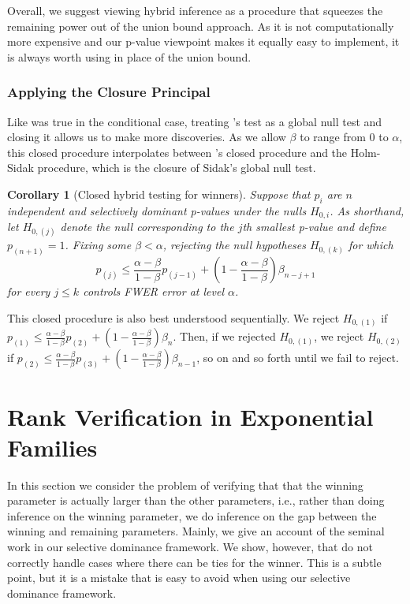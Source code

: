 \documentclass{article}
\newtheorem{corollary}{Corollary}
\begin{document}
Overall, we suggest viewing hybrid inference as a procedure that squeezes the remaining power out of the union bound approach. As it is not computationally more expensive and our p-value viewpoint makes it equally easy to implement, it is always worth using in place of the union bound. 

\subsubsection{Applying the Closure Principal}

Like was true in the conditional case, treating 's test as a global null test and closing it allows us to make more discoveries. As we allow $\beta$ to range from $0$ to $\alpha$, this closed procedure interpolates between 's closed procedure and the Holm-Sidak procedure, which is the closure of Sidak's global null test. 

\begin{corollary}[Closed hybrid testing for winners]
    \label{cor:hyb_closed}
    Suppose that $p_i$ are $n$ independent and selectively dominant p-values under the nulls $H_{0, i}$. As shorthand, let $H_{0, (j)}$ denote the null corresponding to the $j$th smallest p-value and define $p_{(n+1)} = 1$. Fixing some $\beta < \alpha$, rejecting the null hypotheses $H_{0, (k)}$ for which
    \begin{equation*}
        p_{(j)} \leq \frac{\alpha - \beta}{1-\beta} p_{(j-1)} + \left(1 - \frac{\alpha - \beta}{1-\beta} \right) \beta_{n - j + 1}   
    \end{equation*}
    for every $j \leq k$ controls FWER error at level $\alpha$. 
\end{corollary}

This closed procedure is also best understood sequentially. We reject $H_{0, (1)}$ if $p_{(1)} \leq \frac{\alpha - \beta}{1-\beta} p_{(2)} + (1 - \frac{\alpha - \beta}{1-\beta}) \beta_n$. Then, if we rejected $H_{0, (1)}$, we reject $H_{0, (2)}$ if $p_{(2)} \leq  \frac{\alpha - \beta}{1-\beta} p_{(3)} + (1 - \frac{\alpha -\beta }{1-\beta}) \beta_{n-1}$, so on and so forth until we fail to reject. 


\section{Rank Verification in Exponential Families}
\label{sec:rank_verification}

In this section we consider the problem of verifying that that the winning parameter is actually larger than the other parameters, i.e., rather than doing inference on the winning parameter, we do inference on the gap between the winning and remaining parameters. Mainly, we give an account of the seminal work \cite{Hung2019} in our selective dominance framework. We show, however, that \cite{Hung2019} do not correctly handle cases where there can be ties for the winner. This is a subtle point, but it is a mistake that is easy to avoid when using our selective dominance framework.
\end{document}
